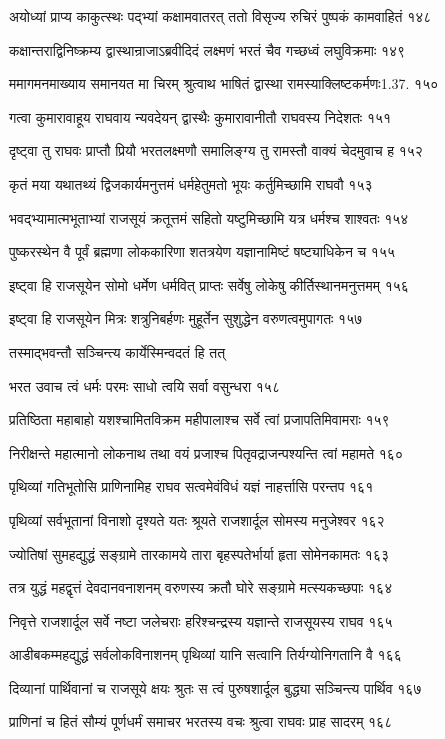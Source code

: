 अयोध्यां प्राप्य काकुत्स्थः पद्भ्यां कक्षामवातरत्
ततो विसृज्य रुचिरं पुष्पकं कामवाहितं १४८

कक्षान्तराद्विनिष्क्रम्य द्वास्थान्राजाऽब्रवीदिदं
लक्ष्मणं भरतं चैव गच्छध्वं लघुविक्रमाः १४९

ममागमनमाख्याय समानयत मा चिरम्
श्रुत्वाथ भाषितं द्वास्था रामस्याक्लिष्टकर्मणः1.37. १५०

गत्वा कुमारावाहूय राघवाय न्यवदेयन्
द्वास्थैः कुमारावानीतौ राघवस्य निदेशतः १५१

दृष्ट्वा तु राघवः प्राप्तौ प्रियौ भरतलक्ष्मणौ
समालिङ्ग्य तु रामस्तौ वाक्यं चेदमुवाच ह १५२

कृतं मया यथातथ्यं द्विजकार्यमनुत्तमं
धर्महेतुमतो भूयः कर्तुमिच्छामि राघवौ १५३

भवद्भ्यामात्मभूताभ्यां राजसूयं क्रतूत्तमं
सहितो यष्टुमिच्छामि यत्र धर्मश्च शाश्वतः १५४

पुष्करस्थेन वै पूर्वं ब्रह्मणा लोककारिणा
शतत्रयेण यज्ञानामिष्टं षष्ट्याधिकेन च १५५

इष्ट्वा हि राजसूयेन सोमो धर्मेण धर्मवित्
प्राप्तः सर्वेषु लोकेषु कीर्तिस्थानमनुत्तमम् १५६

इष्ट्वा हि राजसूयेन मित्रः शत्रुनिबर्हणः
मुहूर्तेन सुशुद्धेन वरुणत्वमुपागतः १५७

तस्माद्भवन्तौ सञ्चिन्त्य कार्येस्मिन्वदतं हि तत्

भरत उवाच
त्वं धर्मः परमः साधो त्वयि सर्वा वसुन्धरा १५८

प्रतिष्ठिता महाबाहो यशश्चामितविक्रम
महीपालाश्च सर्वे त्वां प्रजापतिमिवामराः १५९

निरीक्षन्ते महात्मानो लोकनाथ तथा वयं
प्रजाश्च पितृवद्राजन्पश्यन्ति त्वां महामते १६०

पृथिव्यां गतिभूतोसि प्राणिनामिह राघव
सत्वमेवंविधं यज्ञं नाहर्त्तासि परन्तप १६१

पृथिव्यां सर्वभूतानां विनाशो दृश्यते यतः
श्रूयते राजशार्दूल सोमस्य मनुजेश्वर १६२

ज्योतिषां सुमहद्युद्धं सङ्ग्रामे तारकामये
तारा बृहस्पतेर्भार्या हृता सोमेनकामतः १६३

तत्र युद्धं महद्वृत्तं देवदानवनाशनम्
वरुणस्य क्रतौ घोरे सङ्ग्रामे मत्स्यकच्छपाः १६४

निवृत्ते राजशार्दूल सर्वे नष्टा जलेचराः
हरिश्चन्द्रस्य यज्ञान्ते राजसूयस्य राघव १६५

आडीबकम्महद्युद्धं सर्वलोकविनाशनम्
पृथिव्यां यानि सत्वानि तिर्यग्योनिगतानि वै १६६

दिव्यानां पार्थिवानां च राजसूये क्षयः श्रुतः
स त्वं पुरुषशार्दूल बुद्ध्या सञ्चिन्त्य पार्थिव १६७

प्राणिनां च हितं सौम्यं पूर्णधर्मं समाचर
भरतस्य वचः श्रुत्वा राघवः प्राह सादरम् १६८

